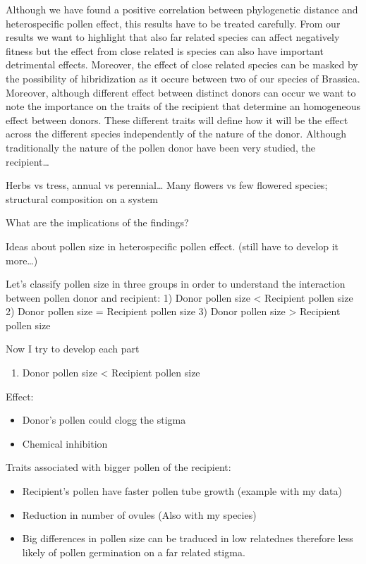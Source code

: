 \documentclass[11pt,a4paper]{article}
\providecommand{\tightlist}{%
  \setlength{\itemsep}{0pt}\setlength{\parskip}{0pt}}
\begin{document}
Although we have found a positive correlation between phylogenetic
distance and heterospecific pollen effect, this results have to be
treated carefully. From our results we want to highlight that also far
related species can affect negatively fitness but the effect from close
related is species can also have important detrimental effects.
Moreover, the effect of close related species can be masked by the
possibility of hibridization as it occure between two of our species of
Brassica. Moreover, although different effect between distinct donors
can occur we want to note the importance on the traits of the recipient
that determine an homogeneous effect between donors. These different
traits will define how it will be the effect across the different
species independently of the nature of the donor. Although traditionally
the nature of the pollen donor have been very studied, the
recipient\ldots{}

Herbs vs tress, annual vs perennial\ldots{} Many flowers vs few flowered
species; structural composition on a system

What are the implications of the findings?

Ideas about pollen size in heterospecific pollen effect. (still have to
develop it more\ldots{})

Let's classify pollen size in three groups in order to understand the
interaction between pollen donor and recipient: 1) Donor pollen size
\textless{} Recipient pollen size 2) Donor pollen size = Recipient
pollen size 3) Donor pollen size \textgreater{} Recipient pollen size

Now I try to develop each part

\begin{enumerate}
\def\labelenumi{\arabic{enumi})}
\tightlist
\item
  Donor pollen size \textless{} Recipient pollen size
\end{enumerate}

Effect:

\begin{itemize}
\item
  Donor's pollen could clogg the stigma
\item
  Chemical inhibition
\end{itemize}

Traits associated with bigger pollen of the recipient:

\begin{itemize}
\item
  Recipient's pollen have faster pollen tube growth (example with my
  data)
\item
  Reduction in number of ovules (Also with my species)
\item
  Big differences in pollen size can be traduced in low relatednes
  therefore less likely of pollen germination on a far related stigma.
\end{itemize}
\end{document}
